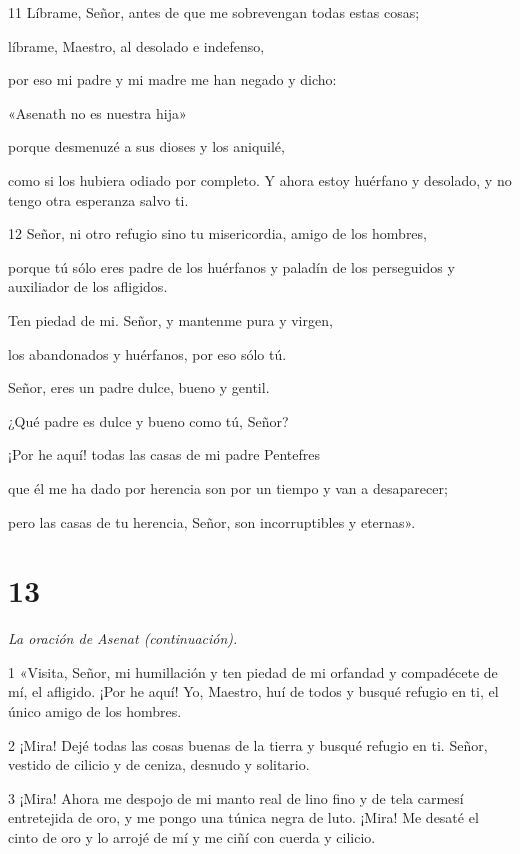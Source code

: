 \par 11 Líbrame, Señor, antes de que me sobrevengan todas estas cosas;
\par líbrame, Maestro, al desolado e indefenso,
\par por eso mi padre y mi madre me han negado y dicho:
\par «Asenath no es nuestra hija»
\par porque desmenuzé a sus dioses y los aniquilé,
\par como si los hubiera odiado por completo. Y ahora estoy huérfano y desolado, y no tengo otra esperanza salvo ti.

\par 12 Señor, ni otro refugio sino tu misericordia, amigo de los hombres,
\par porque tú sólo eres padre de los huérfanos y paladín de los perseguidos y auxiliador de los afligidos.
\par Ten piedad de mi. Señor, y mantenme pura y virgen,
\par los abandonados y huérfanos, por eso sólo tú.
\par Señor, eres un padre dulce, bueno y gentil.
\par ¿Qué padre es dulce y bueno como tú, Señor?
\par ¡Por he aquí! todas las casas de mi padre Pentefres
\par que él me ha dado por herencia son por un tiempo y van a desaparecer;
\par pero las casas de tu herencia, Señor, son incorruptibles y eternas».

\chapter{13}

\par \textit{La oración de Asenat (continuación).}

\par 1 «Visita, Señor, mi humillación y ten piedad de mi orfandad y compadécete de mí, el afligido. ¡Por he aquí! Yo, Maestro, huí de todos y busqué refugio en ti, el único amigo de los hombres.

\par 2 ¡Mira! Dejé todas las cosas buenas de la tierra y busqué refugio en ti. Señor, vestido de cilicio y de ceniza, desnudo y solitario.

\par 3 ¡Mira! Ahora me despojo de mi manto real de lino fino y de tela carmesí entretejida de oro, y me pongo una túnica negra de luto. ¡Mira! Me desaté el cinto de oro y lo arrojé de mí y me ciñí con cuerda y cilicio.

